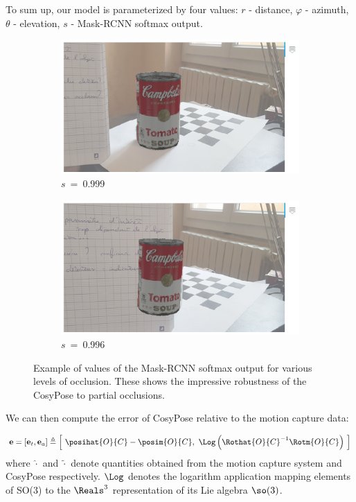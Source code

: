 To sum up, our model is parameterized by four values: $r$ - distance, $\varphi$ - azimuth, $\theta$ - elevation, $s$ - Mask-RCNN softmax output. 


\begin{figure}
    \centering
    \begin{subfigure}{0.47\textwidth}
        \includegraphics[width=\textwidth]{figures/cosyslam/s999.png}
        \caption{$s$~=~0.999}
    \end{subfigure}
    \begin{subfigure}{0.47\textwidth}
        \includegraphics[width=\textwidth]{figures/cosyslam/s996.png}
        \caption{$s$~=~0.996}
    \end{subfigure}
    \caption{Example of values of the Mask-RCNN softmax output for various levels of occlusion. 
    These shows the impressive robustness of the CosyPose to partial occlusions.}
\end{figure}

We can then compute the error of CosyPose relative to the motion capture data: 

\begin{equation}
    \mathbf{e}  = [\mathbf{e}_{t}, \mathbf{e}_{a}]  \triangleq  \left[~\posihat{O}{C} - \posim{O}{C}, ~ \Log \left(\Rothat{O}{C}^{-1}\Rotm{O}{C}\right)~\right]
\end{equation}
%
where $\widehat{\cdot}$ and $\widetilde{\cdot}$ denote quantities obtained from the motion capture system and CosyPose respectively. 
$\Log$ denotes the logarithm application mapping elements of SO(3) to the $\Reals^3$ representation of its Lie algebra 
$\so(3)$.

